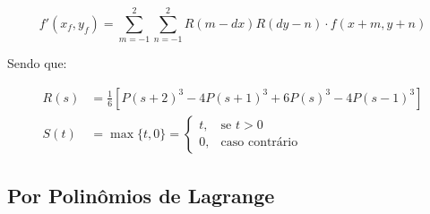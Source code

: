 \[
    f'(x_f, y_f) = \sum_{m = -1}^2 \sum_{n = -1}^2 R(m - dx) R(dy - n) \cdot f(x + m, y + n)
\]

Sendo que:

\begin{align*}
    R(s) &= \frac{1}{6} \left[P(s + 2)^3 - 4 P(s+1)^3 + 6 P(s)^3 - 4 P(s-1)^3\right] \\
    S(t) &= \max\{t, 0\} = \begin{cases}
        t, & \text{se } t > 0 \\
        0, & \text{caso contrário}
    \end{cases}
\end{align*}

\subsection{Por Polinômios de Lagrange} \label{sec:interp:lagrange}
